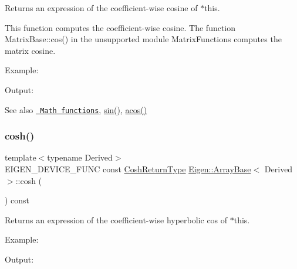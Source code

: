 \begin{DoxyReturn}{Returns}
an expression of the coefficient-\/wise cosine of $\ast$this.
\end{DoxyReturn}
This function computes the coefficient-\/wise cosine. The function Matrix\+Base\+::cos() in the unsupported module Matrix\+Functions computes the matrix cosine.

Example\+: 
\begin{DoxyCodeInclude}{0}
\end{DoxyCodeInclude}
 Output\+: 
\begin{DoxyVerbInclude}
\end{DoxyVerbInclude}


\begin{DoxySeeAlso}{See also}
\href{group__CoeffwiseMathFunctions.html\#cwisetable_cos}{\texttt{ Math functions}}, \mbox{\hyperlink{class_eigen_1_1_array_base_a8f857f93533ac386282f47c5ef05459a}{sin()}}, \mbox{\hyperlink{class_eigen_1_1_array_base_a823b8a01037260c26ea853f41a75dd87}{acos()}} 
\end{DoxySeeAlso}
\mbox{\label{class_eigen_1_1_array_base_a5fd3dbcabcd2857db8f26ca5b321788f}} 
\subsubsection{\texorpdfstring{cosh()}{cosh()}}
{\footnotesize\ttfamily template$<$typename Derived$>$ \\
E\+I\+G\+E\+N\+\_\+\+D\+E\+V\+I\+C\+E\+\_\+\+F\+U\+NC const \mbox{\hyperlink{class_eigen_1_1_cwise_unary_op}{Cosh\+Return\+Type}} \mbox{\hyperlink{class_eigen_1_1_array_base}{Eigen\+::\+Array\+Base}}$<$ Derived $>$\+::cosh (\begin{DoxyParamCaption}{ }\end{DoxyParamCaption}) const\hspace{0.3cm}{\ttfamily [inline]}}

\begin{DoxyReturn}{Returns}
an expression of the coefficient-\/wise hyperbolic cos of $\ast$this.
\end{DoxyReturn}
Example\+: 
\begin{DoxyCodeInclude}{0}
\end{DoxyCodeInclude}
 Output\+: 
\begin{DoxyVerbInclude}
\end{DoxyVerbInclude}


